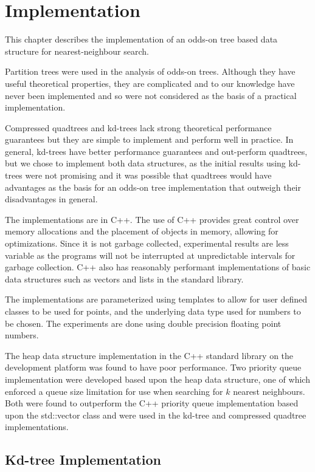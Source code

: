 \documentclass[mcs]{scsthesis}
\begin{document}
\chapter{Implementation}

This chapter describes the implementation of an odds-on tree based data
structure for nearest-neighbour search.

Partition trees were used in the analysis of odds-on trees. Although they have
useful theoretical properties, they are complicated and to our knowledge have
never been implemented and so were not considered as the basis of a practical
implementation.

Compressed quadtrees and kd-trees lack strong theoretical performance
guarantees but they are simple to implement and perform well in practice. In
general, kd-trees have better performance guarantees and out-perform quadtrees,
but we chose to implement both data structures, as the initial results using
kd-trees were not promising and it was possible that quadtrees would have
advantages as the basis for an odds-on tree implementation that outweigh their
disadvantages in general. 

The implementations are in C++. The use of C++ provides great control over
memory allocations and the placement of objects in memory, allowing for
optimizations. Since it is not garbage collected, experimental results are less 
variable as the programs will not be interrupted at unpredictable intervals for
garbage collection. C++ also has reasonably performant implementations of basic
data structures such as vectors and lists in the standard library.

The implementations are parameterized using templates to allow for user defined
classes to be used for points, and the underlying data type used for numbers to
be chosen. The experiments are done using double precision floating point
numbers.

The heap data structure implementation in the C++ standard library on the
development platform was found to have poor performance. Two priority queue
implementation were developed based upon the heap data structure, one of which
enforced a queue size limitation for use when searching for \(k\) nearest
neighbours. Both were found to outperform the C++ priority queue implementation
based upon the std::vector class and were used in the kd-tree and compressed
quadtree implementations.

\section{Kd-tree Implementation}
\end{document}
